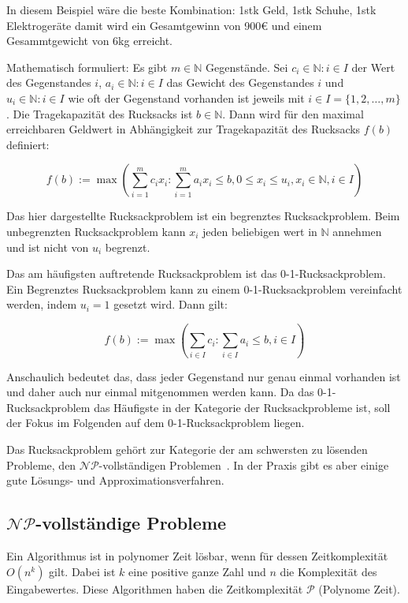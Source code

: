 \documentclass[12pt, a4paper, ngerman]{article}
\newcommand{\natnums}{\ensuremath{\mathbb{N}}}
\begin{document}
In diesem Beispiel wäre die beste Kombination: 1stk Geld, 1stk Schuhe, 1stk Elektrogeräte
damit wird ein Gesamtgewinn von 900€ und einem Gesammtgewicht von 6kg erreicht.

Mathematisch formuliert: Es gibt \(m\in\natnums\) Gegenstände.
Sei \(c_i\in\natnums : i\in I\) der Wert des Gegenstandes \(i\),
\(a_i\in\natnums : i\in I\) das Gewicht des Gegenstandes \(i\)
und \(u_i\in \natnums : i\in I\) wie oft der Gegenstand vorhanden ist jeweils mit \(i\in I = \{1 ,2 ,\ldots ,m\} \).
Die Tragekapazität des Rucksacks ist \(b\in\natnums\).
Dann wird für den maximal erreichbaren Geldwert in Abhängigkeit zur Tragekapazität des Rucksacks \(f(b)\) definiert:

\[
  f(b):=\max(\sum_{i=1}^m c_i x_i : \sum_{i=1}^m a_i x_i\leq b, 0\leq x_i\leq u_i,  x_i\in\natnums, i\in I)
\]

Das hier dargestellte Rucksackproblem ist ein begrenztes Rucksackproblem.
Beim unbegrenzten Rucksackproblem kann \(x_i\) jeden beliebigen wert in \(\natnums \) annehmen und ist nicht von \(u_i\) begrenzt.

Das am häufigsten auftretende Rucksackproblem ist das 0-1-Rucksackproblem.
Ein Begrenztes Rucksackproblem kann zu einem 0-1-Rucksackproblem vereinfacht werden, indem \(u_i=1\) gesetzt wird. Dann gilt:

\[
  f(b):=\max(\sum_{i\in I}c_i : \sum_{i\in I}a_i\leq b, i\in I)
\]

Anschaulich bedeutet das, dass jeder Gegenstand nur genau einmal vorhanden ist
und daher auch nur einmal mitgenommen werden kann.
Da das 0-1-Rucksackproblem das Häufigste in der Kategorie der Rucksackprobleme ist,
soll der Fokus im Folgenden auf dem 0-1-Rucksackproblem liegen.

Das Rucksackproblem gehört zur Kategorie der am schwersten zu lösenden Probleme,
den \(\mathcal{NP}\)-vollständigen Problemen~\cite{mainKnapsack}.
In der Praxis gibt es aber einige gute Lösungs- und Approximationsverfahren.

\subsection{\(\mathcal{NP}\)-vollständige Probleme}
\label{sec:np}

Ein Algorithmus ist in polynomer Zeit lösbar,
wenn für dessen Zeitkomplexität \(O(n^k)\) gilt.
Dabei ist \(k\) eine positive ganze Zahl und \(n\) die Komplexität des Eingabewertes.
Diese Algorithmen haben die Zeitkomplexität \(\mathcal{P}\) (Polynome Zeit).
\end{document}
